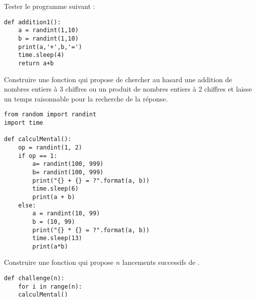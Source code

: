Tester le programme suivant : 
\begin{lstlisting}
def addition1():
    a = randint(1,10)
    b = randint(1,10)
    print(a,'+',b,'=')
    time.sleep(4)
    return a+b
\end{lstlisting}
\begin{Exercise}[title=Opérations]
Construire une fonction  qui propose de chercher au hasard une addition de nombres entiers à 3 chiffres ou un produit de nombres entiers à 2 chiffres et laisse un temps raisonnable pour la recherche de la réponse.
\end{Exercise}
\begin{Answer}
\begin{lstlisting}
from random import randint
import time

def calculMental():
    op = randint(1, 2)
    if op == 1:
        a= randint(100, 999)
        b= randint(100, 999)
        print("{} + {} = ?".format(a, b))
        time.sleep(6)
        print(a + b)
    else:
        a = randint(10, 99)
        b = (10, 99)
        print("{} * {} = ?".format(a, b))
        time.sleep(13)
        print(a*b)
\end{lstlisting}
\end{Answer} 
\begin{Exercise}[title=Un jeu]
Construire une fonction  qui propose $n$ lancements successifs de .
\end{Exercise}
\begin{Answer}
\begin{lstlisting}
def challenge(n):
    for i in range(n):
    calculMental()
\end{lstlisting}
\end{Answer} 
